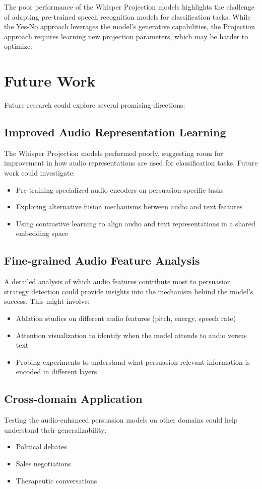 \documentclass{article}
\begin{document}
The poor performance of the Whisper Projection models highlights the challenge of adapting pre-trained speech recognition models for classification tasks. While the Yes-No approach leverages the model's generative capabilities, the Projection approach requires learning new projection parameters, which may be harder to optimize.

\section{Future Work}
Future research could explore several promising directions:

\subsection{Improved Audio Representation Learning}
The Whisper Projection models performed poorly, suggesting room for improvement in how audio representations are used for classification tasks. Future work could investigate:
\begin{itemize}
    \item Pre-training specialized audio encoders on persuasion-specific tasks
    \item Exploring alternative fusion mechanisms between audio and text features
    \item Using contrastive learning to align audio and text representations in a shared embedding space
\end{itemize}

\subsection{Fine-grained Audio Feature Analysis}
A detailed analysis of which audio features contribute most to persuasion strategy detection could provide insights into the mechanism behind the model's success. This might involve:
\begin{itemize}
    \item Ablation studies on different audio features (pitch, energy, speech rate)
    \item Attention visualization to identify when the model attends to audio versus text
    \item Probing experiments to understand what persuasion-relevant information is encoded in different layers
\end{itemize}

\subsection{Cross-domain Application}
Testing the audio-enhanced persuasion models on other domains could help understand their generalizability:
\begin{itemize}
    \item Political debates
    \item Sales negotiations
    \item Therapeutic conversations
\end{itemize}
\end{document}
